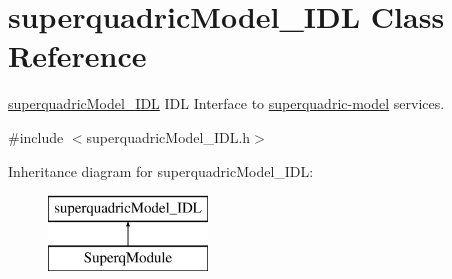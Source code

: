\section{superquadric\-Model\-\_\-\-I\-D\-L Class Reference}
\label{classsuperquadricModel__IDL}


\hyperlink{classsuperquadricModel__IDL}{superquadric\-Model\-\_\-\-I\-D\-L} I\-D\-L Interface to \hyperlink{group__superquadric-model}{superquadric-\/model} services.  




{\ttfamily \#include $<$superquadric\-Model\-\_\-\-I\-D\-L.\-h$>$}

Inheritance diagram for superquadric\-Model\-\_\-\-I\-D\-L\-:\begin{figure}[H]
\begin{center}
\leavevmode
\includegraphics[height=2.000000cm]{classsuperquadricModel__IDL}
\end{center}
\end{figure}
